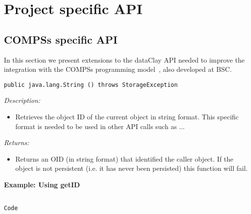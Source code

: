
\chapter{Project specific API}


\section{COMPSs specific API}

In this section we present extensions to the dataClay API needed to improve the integration with the COMPSs programming model~\cite{Tejedor_2008}\cite{Tejedor_2015}, also developed at BSC.




\begin{dBox}
\texttt{public java.lang.String () throws StorageException}
\LINE

{\it Description:}

\begin{itemize}
	\item Retrieves the object ID of the current object in string format. This specific format is needed to be used in other API calls such as ...
\end{itemize}

 
{\it Returns:}

\begin{itemize}
	\item Returns an OID (in string format) that identified the caller object. If the object is not persistent (i.e. it has never been persisted) this function will fail.
\end{itemize}

\end{dBox}

\begin{tBox}
\textcolor{basecolor} {\bf Example: Using getID}
\begin{verbatim}

Code

\end{verbatim}
\end{tBox}








